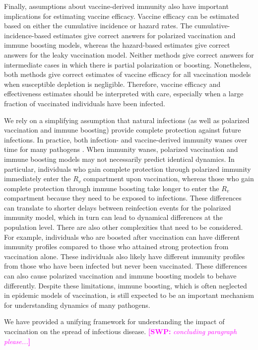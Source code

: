 \documentclass[12pt]{article}
\newcommand{\comment}{\showcomment}
\newcommand{\showcomment}[3]{\textcolor{#1}{\textbf{[#2: }\textsl{#3}\textbf{]}}}
\newcommand{\swp}[1]{\comment{magenta}{SWP}{#1}}
\begin{document}
Finally, assumptions about vaccine-derived immunity also have important implications for estimating vaccine efficacy.
Vaccine efficacy can be estimated based on either the cumulative incidence or hazard rates.
The cumulative-incidence-based estimates give correct answers for polarized vaccination and immune boosting models,
whereas the hazard-based estimates give correct answers for the leaky vaccination model.
Neither methods give correct answers for intermediate cases in which there is partial polarization or boosting.
Nonetheless, both methods give correct estimates of vaccine efficacy for all vaccination models when susceptible depletion is negligible.
Therefore, vaccine efficacy and effectiveness estimates should be interpreted with care, especially when a large fraction of vaccinated individuals have been infected.

We rely on a simplifying assumption that natural infections (as well as polarized vaccination and immune boosting) provide complete protection against future infections.
In practice, both infection- and vaccine-derived immunity wanes over time for many pathogens \citep{heffernan2009implications,lewnard2018vaccine,perez2022}.
When immunity wanes, polarized vaccination and immune boosting models may not necessarily predict identical dynamics.
In particular, individuals who gain complete protection through polarized immunity immediately enter the $R_v$ compartment upon vaccination, whereas those who gain complete protection through immune boosting take longer to enter the $R_v$ compartment because they need to be exposed to infections.
These differences can translate to shorter delays between reinfection events for the polarized immunity model, which in turn can lead to dynamical differences at the population level.
There are also other complexities that need to be considered.
For example, individuals who are boosted after vaccination can have different immunity profiles compared to those who attained strong protection from vaccination alone.
These individuals also likely have different immunity profiles from those who have been infected but never been vaccinated.
These differences can also cause polarized vaccination and immune boosting models to behave differently.
Despite these limitations, immune boosting, which is often neglected in epidemic models of vaccination, is still expected to be an important mechanism for understanding dynamics of many pathogens.

We have provided a unifying framework for understanding the impact of vaccination on the spread of infectious disease.
\swp{concluding paragraph please...}
\end{document}
